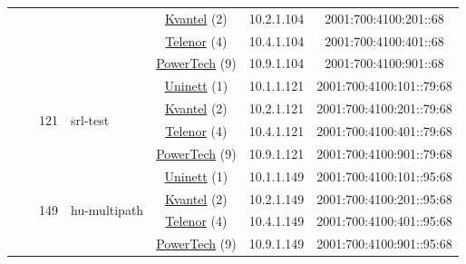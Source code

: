 \begin{small}
\begin{center}
\begin{longtable}{|c|c|c|c|c|c|c|c|}
  &  & \multicolumn{2}{|c|}{} & \multicolumn{2}{|c|}{\tiny{\href{http://kvantel.no}{Kvantel} (2)}} & \tiny{10.2.1.104} & \tiny{2001:700:4100:201::68} \\* \cline{5-5}\cline{6-6}\cline{7-7}\cline{8-8}
  &  & \multicolumn{2}{|c|}{} & \multicolumn{2}{|c|}{\tiny{\href{https://www.telenor.no}{Telenor} (4)}} & \tiny{10.4.1.104} & \tiny{2001:700:4100:401::68} \\* \cline{5-5}\cline{6-6}\cline{7-7}\cline{8-8}
  &  & \multicolumn{2}{|c|}{} & \multicolumn{2}{|c|}{\tiny{\href{http://www.powertech.no}{PowerTech} (9)}} & \tiny{10.9.1.104} & \tiny{2001:700:4100:901::68} \\* \cline{3-3}\cline{4-4}\cline{5-5}\cline{6-6}\cline{7-7}\cline{8-8}
  &  & \multirow{4}{*}{\tiny{121}} & \multicolumn{1}{|l|}{\multirow{4}{*}{\tiny{srl-test}}} & \multicolumn{2}{|c|}{\tiny{\href{https://www.uninett.no}{Uninett} (1)}} & \tiny{10.1.1.121} & \tiny{2001:700:4100:101::79:68} \\* \cline{5-5}\cline{6-6}\cline{7-7}\cline{8-8}
  &  &  &  & \multicolumn{2}{|c|}{\tiny{\href{http://kvantel.no}{Kvantel} (2)}} & \tiny{10.2.1.121} & \tiny{2001:700:4100:201::79:68} \\* \cline{5-5}\cline{6-6}\cline{7-7}\cline{8-8}
  &  &  &  & \multicolumn{2}{|c|}{\tiny{\href{https://www.telenor.no}{Telenor} (4)}} & \tiny{10.4.1.121} & \tiny{2001:700:4100:401::79:68} \\* \cline{5-5}\cline{6-6}\cline{7-7}\cline{8-8}
  &  &  &  & \multicolumn{2}{|c|}{\tiny{\href{http://www.powertech.no}{PowerTech} (9)}} & \tiny{10.9.1.121} & \tiny{2001:700:4100:901::79:68} \\* \cline{3-3}\cline{4-4}\cline{5-5}\cline{6-6}\cline{7-7}\cline{8-8}
  &  & \multirow{4}{*}{\tiny{149}} & \multicolumn{1}{|l|}{\multirow{4}{*}{\tiny{hu-multipath}}} & \multicolumn{2}{|c|}{\tiny{\href{https://www.uninett.no}{Uninett} (1)}} & \tiny{10.1.1.149} & \tiny{2001:700:4100:101::95:68} \\* \cline{5-5}\cline{6-6}\cline{7-7}\cline{8-8}
  &  &  &  & \multicolumn{2}{|c|}{\tiny{\href{http://kvantel.no}{Kvantel} (2)}} & \tiny{10.2.1.149} & \tiny{2001:700:4100:201::95:68} \\* \cline{5-5}\cline{6-6}\cline{7-7}\cline{8-8}
  &  &  &  & \multicolumn{2}{|c|}{\tiny{\href{https://www.telenor.no}{Telenor} (4)}} & \tiny{10.4.1.149} & \tiny{2001:700:4100:401::95:68} \\* \cline{5-5}\cline{6-6}\cline{7-7}\cline{8-8}
  &  &  &  & \multicolumn{2}{|c|}{\tiny{\href{http://www.powertech.no}{PowerTech} (9)}} & \tiny{10.9.1.149} & \tiny{2001:700:4100:901::95:68} \\* \cline{3-3}\cline{4-4}\cline{5-5}\cline{6-6}\cline{7-7}\cline{8-8}

\end{longtable}
\end{center}
\end{small}
